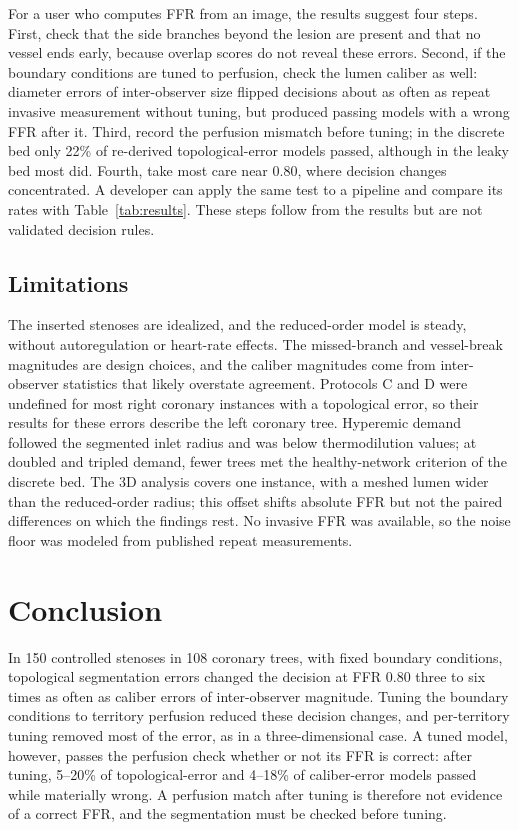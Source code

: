 \documentclass[journal]{IEEEtran}
\begin{document}
For a user who computes FFR from an image, the results suggest four steps. First, check that the side branches
beyond the lesion are present and that no vessel ends early, because overlap scores do not reveal these errors.
Second, if the boundary conditions are tuned to perfusion, check the lumen caliber as well: diameter errors of
inter-observer size flipped decisions about as often as repeat invasive measurement without tuning, but produced
passing models with a wrong FFR after it. Third, record the perfusion mismatch before tuning; in the discrete bed
only 22\% of re-derived topological-error models passed, although in the leaky bed most did. Fourth, take most care near 0.80,
where decision changes concentrated. A developer can apply the same test to a pipeline and compare its rates with Table~\ref{tab:results}.
These steps follow from the results but are not validated decision rules.

\subsection{Limitations}
The inserted stenoses are idealized, and the reduced-order model is steady, without autoregulation or heart-rate
effects. The missed-branch and vessel-break magnitudes are design choices, and the caliber magnitudes come from
inter-observer statistics that likely overstate agreement. Protocols C and D were undefined for most right coronary
instances with a topological error, so their results for these errors describe the left coronary tree. Hyperemic
demand followed the segmented inlet radius and was below thermodilution values; at doubled and tripled demand,
fewer trees met the healthy-network criterion of the discrete bed. The 3D analysis covers one instance, with a
meshed lumen wider than the reduced-order radius; this offset shifts absolute FFR but not the paired differences on
which the findings rest. No invasive FFR was available, so the noise floor was modeled from published repeat
measurements.

\section{Conclusion}
In 150 controlled stenoses in 108 coronary trees, with fixed boundary conditions, topological segmentation errors
changed the decision at FFR 0.80 three to six times as often as caliber errors of inter-observer magnitude. Tuning the
boundary conditions to territory perfusion reduced these decision changes, and per-territory tuning removed most of
the error, as in a three-dimensional case. A tuned model, however, passes the perfusion check whether or not its FFR
is correct: after tuning, 5--20\% of topological-error and 4--18\% of caliber-error models passed while materially
wrong. A perfusion match after tuning is therefore not evidence of a correct FFR, and the segmentation must be checked
before tuning.
\end{document}
